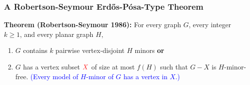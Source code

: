 \documentclass{beamer}
\begin{document}
\begin{frame}
\begin{center}
    \end{center}
\end{frame}


\begin{frame}
  \frametitle{A Robertson-Seymour Erdős-Pósa-Type Theorem}

  \noindent\textbf{Theorem (Robertson-Seymour 1986):} For every graph $G$, every integer $k\ge 1$,  and every planar graph $H$,
  \begin{enumerate}%
    \item $G$ contains $k$ pairwise vertex-disjoint $H$ minors \textbf{or}
    \item $G$ has a vertex subset $\mathcolor{red}{X}$ of size at most $f(H)$ such that $G-X$ is $H$-minor-free. \textcolor{blue}{(Every model of $H$-minor of $G$ has a vertex in $X$.)}
  \end{enumerate}
\end{frame}
\end{document}
